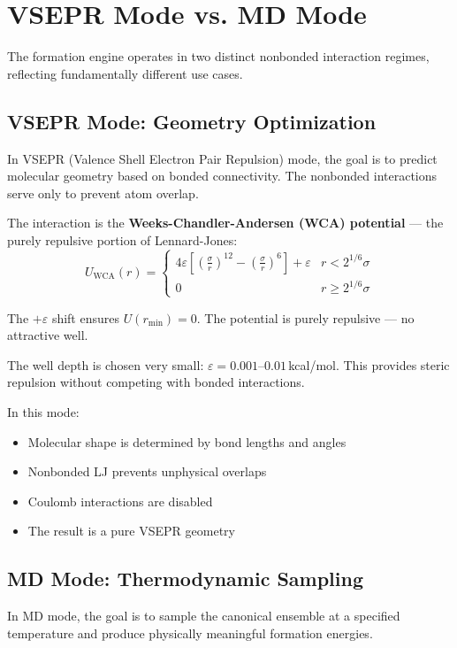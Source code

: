 \documentclass[11pt]{article}
\begin{document}
\section{VSEPR Mode vs. MD Mode}

The formation engine operates in two distinct nonbonded interaction regimes, reflecting fundamentally different use cases.

\subsection{VSEPR Mode: Geometry Optimization}

In VSEPR (Valence Shell Electron Pair Repulsion) mode, the goal is to predict molecular geometry based on bonded connectivity. The nonbonded interactions serve only to prevent atom overlap.

The interaction is the \textbf{Weeks-Chandler-Andersen (WCA) potential} — the purely repulsive portion of Lennard-Jones:
\begin{equation}
U_{\text{WCA}}(r) = \begin{cases}
4\varepsilon\left[\left(\frac{\sigma}{r}\right)^{12} - \left(\frac{\sigma}{r}\right)^6\right] + \varepsilon & r < 2^{1/6}\sigma \\
0 & r \geq 2^{1/6}\sigma
\end{cases}
\end{equation}

The $+\varepsilon$ shift ensures $U(r_{\min}) = 0$. The potential is purely repulsive — no attractive well.

The well depth is chosen very small: $\varepsilon = 0.001$–$0.01$\,kcal/mol. This provides steric repulsion without competing with bonded interactions.

In this mode:
\begin{itemize}
\item Molecular shape is determined by bond lengths and angles
\item Nonbonded LJ prevents unphysical overlaps
\item Coulomb interactions are disabled
\item The result is a pure VSEPR geometry
\end{itemize}

\subsection{MD Mode: Thermodynamic Sampling}

In MD mode, the goal is to sample the canonical ensemble at a specified temperature and produce physically meaningful formation energies.
\end{document}
